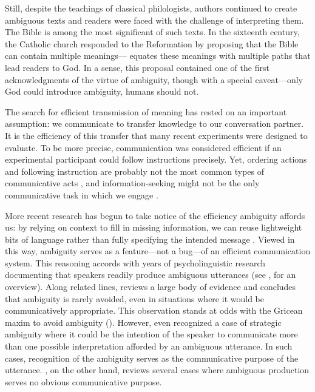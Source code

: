 \documentclass[10pt,a4paper]{article}
\newcommand{\gcs}[1]{\textcolor{blue}{[gcs: #1]}}
\begin{document}
Still, despite the teachings of classical philologists, authors continued to  create ambiguous texts and readers were faced with the challenge of interpreting them. The Bible is among the most significant of such texts. In the sixteenth century, the Catholic church responded to the Reformation by proposing that the Bible can contain multiple meanings--- equates these meanings with multiple paths that lead readers to God. In a sense, this proposal contained one of the first acknowledgments of the virtue of ambiguity, though with a  special caveat---only God could introduce ambiguity, humans should not. 

The search for efficient transmission of meaning has rested on an important assumption: we communicate to transfer knowledge to our conversation partner. It is the efficiency of this transfer that many recent experiments were designed to evaluate. To be more precise, communication was considered efficient if an experimental participant could follow instructions precisely. Yet, ordering actions and following instruction are probably not  the most common types of communicative acts \cite{foppa1995mutual}, and information-seeking might not be the only communicative task in which we engage \cite{markova1995preface}.

More recent research has begun to take notice of the efficiency ambiguity affords us: by relying on context to fill in missing information, we can reuse lightweight bits of language rather than fully specifying the intended message \cite{levinson2000,piantadosietal2012,wasow2015}. 
Viewed in this way, ambiguity serves as a feature---not a bug---of an efficient communication system.
This reasoning accords with years of psycholinguistic research documenting that speakers readily produce ambiguous utterances (see , for an overview). 
Along related lines,  reviews a large body of evidence and concludes that ambiguity is rarely avoided, even in situations where it would be communicatively appropriate.
This observation stands at odds with the Gricean maxim to avoid ambiguity ().
However, even \citeauthor{grice1975} recognized a case of strategic ambiguity where it could be the intention of the speaker to communicate more than one possible interpretation afforded by an ambiguous utterance. In such cases, recognition of the ambiguity serves as the communicative purpose of the utterance. \citeauthor{wasow2015}, on the other hand, reviews several cases where ambiguous production serves no obvious communicative purpose.
\end{document}
